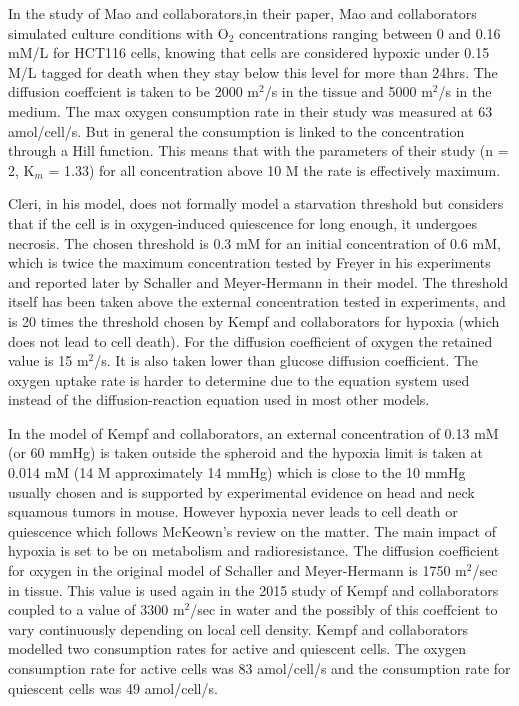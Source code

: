 \documentclass[11pt,a4paper]{article}
\begin{document}
In the study of Mao and collaborators,in their paper, Mao and collaborators simulated culture conditions with O$_{2}$ concentrations ranging between 0 and 0.16 mM/L for HCT116 cells, knowing that cells are considered hypoxic under 0.15 \textmu M/L tagged for death when they stay below this level for more than 24hrs. The diffusion coeffcient is taken to be 2000 \textmu m$^2$/s in the tissue and 5000 \textmu m$^2$/s in the medium. The max oxygen consumption rate in their study was measured at 63 amol/cell/s. But in general the consumption is linked to the concentration through a Hill function. This means that with the parameters of their study (n = 2, K$_m$ = 1.33) for all concentration above 10 \textmu M the rate is effectively maximum.

Cleri, in his model, does not formally model a starvation threshold but considers that if the cell is in oxygen-induced quiescence for long enough, it undergoes necrosis. The chosen threshold is 0.3 mM for an initial concentration of 0.6 mM, which is twice the maximum concentration tested by Freyer in his experiments and reported later by Schaller and Meyer-Hermann in their model. The threshold itself has been taken above the external concentration tested in experiments, and is 20 times the threshold chosen by Kempf and collaborators for hypoxia (which does not lead to cell death). For the diffusion coefficient of oxygen the retained value is 15 \textmu m$^2$/s. It is also taken lower than glucose diffusion coefficient. The oxygen uptake rate is harder to determine due to the equation system used instead of the diffusion-reaction equation used in most other models.

In the model of Kempf and collaborators, an external concentration of 0.13 mM (or 60 mmHg) is taken outside the spheroid and the hypoxia limit is taken at 0.014 mM (14 \textmu M approximately 14 mmHg) which is close to the 10 mmHg usually chosen and is supported by experimental evidence on head and neck squamous tumors in mouse. However hypoxia never leads to cell death or quiescence which follows McKeown's review on the matter. The main impact of hypoxia is set to be on metabolism and radioresistance. The diffusion coefficient for oxygen in the original model of Schaller and Meyer-Hermann is 1750 \textmu m$^2$/sec in tissue. This value is used again in the 2015 study of Kempf and collaborators coupled to a value of 3300 \textmu m$^2$/sec in water and the possibly of this coeffcient to vary continuously depending on local cell density. Kempf and collaborators modelled two consumption rates for active and quiescent cells. The oxygen consumption rate for active cells was 83 amol/cell/s and the consumption rate for quiescent cells was 49 amol/cell/s.
\end{document}
